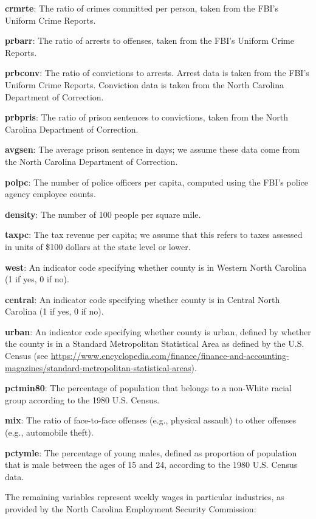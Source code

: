 \documentclass[]{article}
\begin{document}
\textbf{crmrte}: The ratio of crimes committed per person, taken from
the FBI's Uniform Crime Reports.

\textbf{prbarr}: The ratio of arrests to offenses, taken from the FBI's
Uniform Crime Reports.

\textbf{prbconv}: The ratio of convictions to arrests. Arrest data is
taken from the FBI's Uniform Crime Reports. Conviction data is taken
from the North Carolina Department of Correction.

\textbf{prbpris}: The ratio of prison sentences to convictions, taken
from the North Carolina Department of Correction.

\textbf{avgsen}: The average prison sentence in days; we assume these
data come from the North Carolina Department of Correction.

\textbf{polpc}: The number of police officers per capita, computed using
the FBI's police agency employee counts.

\textbf{density}: The number of 100 people per square mile.

\textbf{taxpc}: The tax revenue per capita; we assume that this refers
to taxes assessed in units of \$100 dollars at the state level or lower.

\textbf{west}: An indicator code specifying whether county is in Western
North Carolina (1 if yes, 0 if no).

\textbf{central}: An indicator code specifying whether county is in
Central North Carolina (1 if yes, 0 if no).

\textbf{urban}: An indicator code specifying whether county is urban,
defined by whether the county is in a Standard Metropolitan Statistical
Area as defined by the U.S. Census (see
\url{https://www.encyclopedia.com/finance/finance-and-accounting-magazines/standard-metropolitan-statistical-areas}).

\textbf{pctmin80}: The percentage of population that belongs to a
non-White racial group according to the 1980 U.S. Census.

\textbf{mix}: The ratio of face-to-face offenses (e.g., physical
assault) to other offenses (e.g., automobile theft).

\textbf{pctymle}: The percentage of young males, defined as proportion
of population that is male between the ages of 15 and 24, according to
the 1980 U.S. Census data.

The remaining variables represent weekly wages in particular industries,
as provided by the North Carolina Employment Security Commission:
\end{document}

